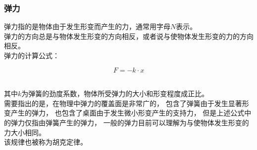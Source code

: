 \documentclass[UTF8]{ctexart}
\begin{document}
\subsubsection{弹力}
    弹力指的是物体由于发生形变而产生的力，通常用字母$N$表示。\\[2mm]
    弹力的方向总是与物体发生形变的方向相反，或者说与使物体发生形变的力的方向相反。\\[4mm]
    弹力的计算公式：
    \begin{large}
        \begin{equation*}
            F=-k\cdot x
        \end{equation*}
    \end{large}\\
    其中$k$为弹簧的劲度系数，物体所受弹力的大小和形变程度成正比。\\[3mm]
    需要指出的是，在物理中弹力的覆盖面是非常广的，
    包含了弹簧由于发生显著形变产生的弹力，
    也包含了桌面由于发生微小形变产生的支持力，
    但是上述公式中的弹力仅指由弹簧产生的弹力，
    一般的弹力目前可以理解为与使物体发生形变的力大小相同。\\[3mm]
    该规律也被称为胡克定律。

\newpage
\end{document}

